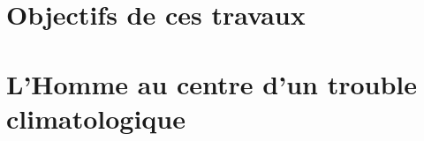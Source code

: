 

\section{Objectifs de ces travaux} %
\label{sec:objectifs_de_ces_travaux}





\section{L’Homme au centre d’un trouble climatologique} %
\label{sec:l_homme_au_centre_d_un_trouble_climatologique}
